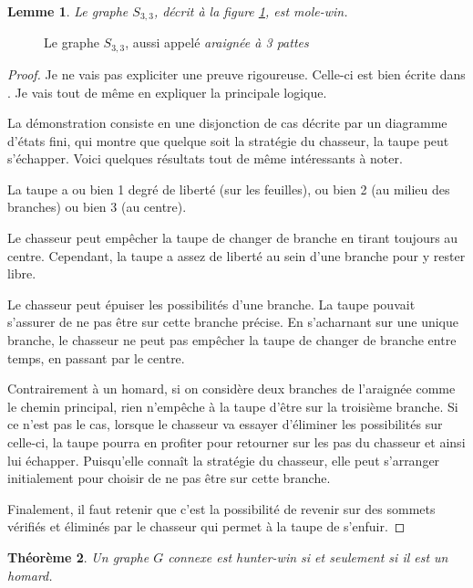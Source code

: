 \documentclass[12pt]{article}
\newtheorem{theoreme}{Théorème}
\newtheorem{lemme}[theoreme]{Lemme}
\begin{document}
\begin{lemme}\label{thm:araignee}
    Le graphe $S_{3,3}$, décrit à la figure \ref{fig:araignee}, est mole-win.
\end{lemme}

\begin{figure}[]
    \centering
    
    \caption{Le graphe $S_{3,3}$, aussi appelé \emph{araignée à 3 pattes}}
    \label{fig:araignee}
\end{figure}

\begin{proof}
Je ne vais pas expliciter une preuve rigoureuse. Celle-ci est bien écrite dans \cite{komarov2013hunter}. Je vais tout de même en expliquer la principale logique. 

La démonstration consiste en une disjonction de cas décrite par un diagramme d'états fini, qui montre que quelque soit la stratégie du chasseur, la taupe peut s'échapper. Voici quelques résultats tout de même intéressants à noter.

La taupe a ou bien 1 degré de liberté (sur les feuilles), ou bien 2 (au milieu des branches) ou bien 3 (au centre).

Le chasseur peut empêcher la taupe de changer de branche en tirant toujours au centre. Cependant, la taupe a assez de liberté au sein d'une branche pour y rester libre.

Le chasseur peut épuiser les possibilités d'une branche. La taupe pouvait s'assurer de ne pas être sur cette branche précise. En s'acharnant sur une unique branche, le chasseur ne peut pas empêcher la taupe de changer de branche entre temps, en passant par le centre. 

Contrairement à un homard, si on considère deux branches de l'araignée comme le chemin principal, rien n'empêche à la taupe d'être sur la troisième branche. Si ce n'est pas le cas, lorsque le chasseur va essayer d'éliminer les possibilités sur celle-ci, la taupe pourra en profiter pour retourner sur les pas du chasseur et ainsi lui échapper. Puisqu'elle connaît la stratégie du chasseur, elle peut s'arranger initialement pour choisir de ne pas être sur cette branche.

Finalement, il faut retenir que c'est la possibilité de revenir sur des sommets vérifiés et éliminés par le chasseur qui permet à la taupe de s'enfuir.
\end{proof}

\begin{theoreme}
    Un graphe $G$ connexe est hunter-win si et seulement si il est un homard.
\end{theoreme}
\end{document}

